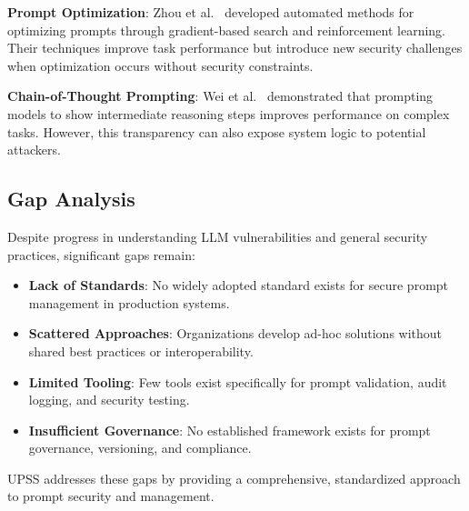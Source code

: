 \textbf{Prompt Optimization}: Zhou et al.~\cite{zhou2022large} developed automated methods for optimizing prompts through gradient-based search and reinforcement learning. Their techniques improve task performance but introduce new security challenges when optimization occurs without security constraints.

\textbf{Chain-of-Thought Prompting}: Wei et al.~\cite{wei2022chain} demonstrated that prompting models to show intermediate reasoning steps improves performance on complex tasks. However, this transparency can also expose system logic to potential attackers.

\subsection{Gap Analysis}

Despite progress in understanding LLM vulnerabilities and general security practices, significant gaps remain:

\begin{itemize}
    \item \textbf{Lack of Standards}: No widely adopted standard exists for secure prompt management in production systems.
    \item \textbf{Scattered Approaches}: Organizations develop ad-hoc solutions without shared best practices or interoperability.
    \item \textbf{Limited Tooling}: Few tools exist specifically for prompt validation, audit logging, and security testing.
    \item \textbf{Insufficient Governance}: No established framework exists for prompt governance, versioning, and compliance.
\end{itemize}

UPSS addresses these gaps by providing a comprehensive, standardized approach to prompt security and management.
